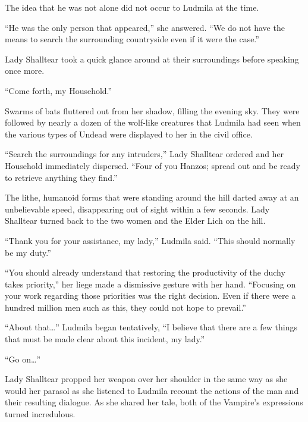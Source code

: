  

The idea that he was not alone did not occur to Ludmila at the time.

 

“He was the only person that appeared,” she answered. “We do not have the means to search the surrounding countryside even if it were the case.”

 

Lady Shalltear took a quick glance around at their surroundings before speaking once more.

 

“Come forth, my Household.”

 

Swarms of bats fluttered out from her shadow, filling the evening sky. They were followed by nearly a dozen of the wolf-like creatures that Ludmila had seen when the various types of Undead were displayed to her in the civil office.

 

“Search the surroundings for any intruders,” Lady Shalltear ordered and her Household immediately dispersed. “Four of you Hanzos; spread out and be ready to retrieve anything they find.”

 

The lithe, humanoid forms that were standing around the hill darted away at an unbelievable speed, disappearing out of sight within a few seconds. Lady Shalltear turned back to the two women and the Elder Lich on the hill.

 

“Thank you for your assistance, my lady,” Ludmila said. “This should normally be my duty.”

 

“You should already understand that restoring the productivity of the duchy takes priority,” her liege made a dismissive gesture with her hand. “Focusing on your work regarding those priorities was the right decision. Even if there were a hundred million men such as this, they could not hope to prevail.”

 

“About that…” Ludmila began tentatively, “I believe that there are a few things that must be made clear about this incident, my lady.”

 

“Go on…”

 

Lady Shalltear propped her weapon over her shoulder in the same way as she would her parasol as she listened to Ludmila recount the actions of the man and their resulting dialogue. As she shared her tale, both of the Vampire’s expressions turned incredulous.

